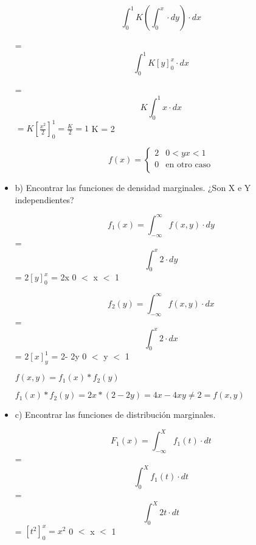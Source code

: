 \documentclass{oxmathproblems}
\begin{document}
\begin{questions}
\begin{itemize}
 \begin{equation}
 \int _{0}^{1} K (\int _{0}^{x}  \cdot dy) \cdot dx
\end{equation} 

= \begin{equation}
 \int _{0}^{1} K [y]^x_0 \cdot dx
\end{equation} 

= 
\begin{equation}
K \int _{0}^{1}  x \cdot dx
\end{equation}
$
= K [\frac{x^2}{2}]^1_0 
= \frac{K}{2} = 1
$
K = 2

\[ 
f(x) = 
     \begin{cases}
        2  & 0  < {y}   
        {x} < 1 \\
       0 & \text{en otro caso} \\
     \end{cases}
\]

\item  b) Encontrar las funciones de densidad marginales. ¿Son X e Y independientes?


\begin{equation}
f_1(x)= \int _{-\infty}^{\infty} f(x,y)  \cdot dy
\end{equation} 
 = 
\begin{equation}
\int _{0}^{x} 2  \cdot dy
\end{equation} 
= $2[y]^x_0 $
= 2x      0 $<$ x $<$ 1 



\begin{equation}
f_2(y)= \int _{-\infty}^{\infty} f(x,y)  \cdot dx
\end{equation} 
 = 
\begin{equation}
\int _{0}^{x} 2  \cdot dx
\end{equation} 
= $2[x]^1_y $
= 2- 2y      0 $<$ y $<$ 1 

$f(x,y)= f_1(x)*f_2(y) $

$f_1(x)*f_2(y) = 2x*(2-2y) = 4x-4xy \neq 2 = f(x,y)$

\item  c) Encontrar las funciones de distribución marginales. 

\begin{equation}
F_1(x) = \int _{-\infty}^{X} f_1(t)  \cdot dt
\end{equation} 
= 
\begin{equation}
 \int _{0}^{X} f_1(t)  \cdot dt
\end{equation} 
= 
\begin{equation}
 \int _{0}^{X} 2t  \cdot dt
\end{equation} 
= $ [t^2]_0^x = x^2 $    0 $<$ x $<$ 1 




\end{itemize}
\end{questions}
\end{document}
